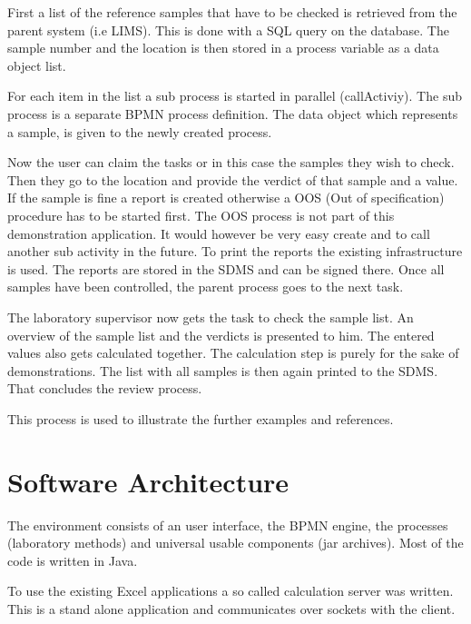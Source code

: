 \documentclass[paper=a4,twoside=false,BCOR=0mm,DIV=calc,fontsize=12pt]{scrartcl}
\begin{document}
First a list of the reference samples that have to be checked is retrieved from the parent system (i.e LIMS). This is done with a SQL query on the database. 
The sample number and the location is then stored in a process variable as a data object list.

For each item in the list a sub process is started in parallel (callActiviy). The sub process is a separate BPMN process definition.
The data object which represents a sample, is given to the newly created process.

Now the user can claim the tasks or in this case the samples they wish to check. Then they go to the location and provide the verdict of that sample and a value. If the sample is fine a report is created otherwise a OOS (Out of specification) procedure has to be started first. The OOS process is not part of this demonstration application. It would however be very easy create and to call another sub activity in the future.
To print the reports the existing infrastructure is used. The reports are stored in the SDMS and can be signed there.
Once all samples have been controlled, the parent process goes to the next task.

The laboratory supervisor now gets the task to check the sample list. An overview of the sample list and the verdicts is presented to him. The entered values also gets calculated together. The calculation step is purely for the sake of demonstrations.
The list with all samples is then again printed to the SDMS. That concludes the review process.

This process is used to illustrate the further examples and references.



\section{Software Architecture}
The environment consists of an user interface, the BPMN engine, the processes (laboratory methods) and universal usable components (jar archives). Most of the code is written in Java. 

To use the existing Excel applications a so called calculation server was written. This is a stand alone application and communicates over sockets with the client.
\end{document}
